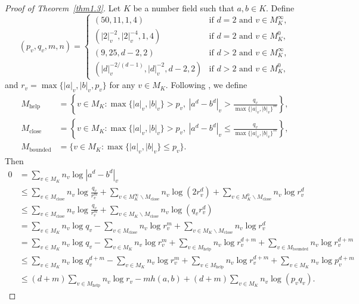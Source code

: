 \documentclass[11pt]{amsart}
\numberwithin{equation}{section}
\theoremstyle{plain}
\theoremstyle{definition}
\theoremstyle{remark}
\newcommand{\bounded}{\mathrm{bounded}}
\newcommand{\close}{\mathrm{close}}
\newcommand{\help}{\mathrm{help}}
\begin{document}
\begin{proof}[Proof of Theorem~\ref{thm1.3}]
Let $K$ be a number field such
that $a,b\in K$. Define
\[
(p_{v},q_{v},m,n)=\begin{cases}
(50,11,1,4) & \text{if }d=2\text{ and }v\in M_{K}^{\infty},\\
\left(|2|_{v}^{-2},|2|_{v}^{-4},1,4\right) & \text{if }d=2\text{ and }v\in M_{K}^{0},\\
(9,25,d-2,2) & \text{if }d>2\text{ and }v\in M_{K}^{\infty},\\
\left(|d|_{v}^{-2/(d-1)},|d|_{v}^{-2},d-2,2\right) & \text{if }d>2\text{ and }v\in M_{K}^{0},
\end{cases}
\]
and $r_{v}=\max\{|a|_{v},|b|_{v},p_{v}\}$ for any $v\in M_{K}$.
Following \cite[Section 8.2]{DKY2}, we define
\begin{align*}
M_{\help} & =\left\{ v\in M_{K}:\max\{|a|_{v},|b|_{v}\}>p_{v},\ \left|a^{d}-b^{d}\right|_{v}>\frac{q_{v}}{\max\{|a|_{v},|b|_{v}\}^{m}}\right\} ,\\
M_{\close} & =\left\{ v\in M_{K}:\max\{|a|_{v},|b|_{v}\}>p_{v},\ \left|a^{d}-b^{d}\right|_{v}\leq\frac{q_{v}}{\max\{|a|_{v},|b|_{v}\}^{m}}\right\} ,\\
M_{\bounded} & =\{v\in M_{K}:\max\{|a|_{v},|b|_{v}\}\leq p_{v}\}.
\end{align*}
Then
\allowdisplaybreaks
\begin{align*}
0 & =\sum_{v\in M_{K}}n_{v}\log\left|a^{d}-b^{d}\right|_{v}\\
 & \leq\sum_{v\in M_{\close}}n_{v}\log\frac{q_{v}}{r_{v}^{m}}+\sum_{v\in M_{K}^{\infty}\backslash M_{\close}}n_{v}\log\left(2r_{v}^{d}\right)+\sum_{v\in M_{K}^{0}\backslash M_{\close}}n_{v}\log r_{v}^{d}\\
 & \leq\sum_{v\in M_{\close}}n_{v}\log\frac{q_{v}}{r_{v}^{m}}+\sum_{v\in M_{K}\backslash M_{\close}}n_{v}\log\left(q_{v}r_{v}^{d}\right)\\
 & =\sum_{v\in M_{K}}n_{v}\log q_{v}-\sum_{v\in M_{\close}}n_{v}\log r_{v}^{m}+\sum_{v\in M_{K}\backslash M_{\close}}n_{v}\log r_{v}^{d}\\
 & =\sum_{v\in M_{K}}n_{v}\log q_{v}-\sum_{v\in M_{K}}n_{v}\log r_{v}^{m}+\sum_{v\in M_{\help}}n_{v}\log r_{v}^{d+m}+\sum_{v\in M_{\bounded}}n_{v}\log r_{v}^{d+m}\\
 & \leq\sum_{v\in M_{K}}n_{v}\log q_{v}^{d+m}-\sum_{v\in M_{K}}n_{v}\log r_{v}^{m}+\sum_{v\in M_{\help}}n_{v}\log r_{v}^{d+m}+\sum_{v\in M_{K}}n_{v}\log p_{v}^{d+m}\\
 & \leq(d+m)\sum_{v\in M_{\help}}n_{v}\log r_{v}-mh(a,b)+(d+m)\sum_{v\in M_{K}}n_{v}\log(p_{v}q_{v}).

\end{align*}
\end{proof}
\end{document}
